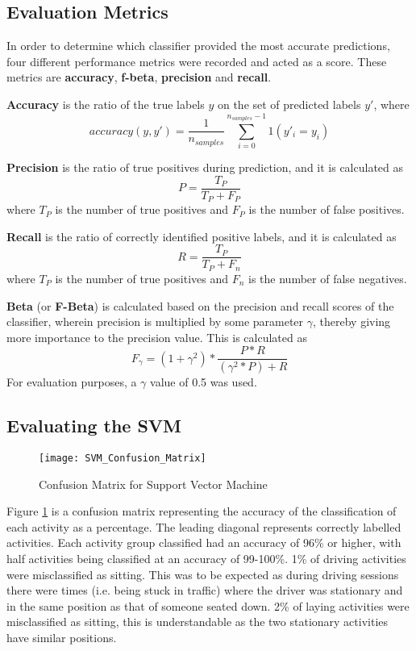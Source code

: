\subsection{Evaluation Metrics}

In order to determine which classifier provided the most accurate predictions, four different performance metrics were recorded and acted as a score. These metrics are \textbf{accuracy},
\textbf{f-beta}, \textbf{precision} and \textbf{recall}.

\textbf{Accuracy} is the ratio of the true labels $y$ on the set of predicted labels $y'$, where \[accuracy(y, y') = \frac{1}{n_{samples}}\sum_{i=0}^{n_{samples}-1} 1(y'_i = y_i)\]

\textbf{Precision} is the ratio of true positives during prediction, and it is calculated as \[P = \frac{T_P}{T_P+F_P}\] where \(T_P\) is the number of true positives and \(F_P\) is the number of false positives.

\textbf{Recall} is the ratio of correctly identified positive labels, and it is calculated as \[R = \frac{T_P}{T_P+F_n}\] where \(T_P\) is the number of true positives and \(F_n\) is the number of false negatives.

\textbf{Beta} (or \textbf{F-Beta})  is calculated based on the precision and recall scores of the classifier, wherein precision is multiplied by some parameter $\gamma$, thereby giving more
importance to the precision value. This is calculated as \[F_\gamma = (1+\gamma^2) * \frac{P*R}{(\gamma^2*P)+R}\] For evaluation purposes, a $\gamma$ value of 0.5 was used.

\subsection{Evaluating the SVM}

\begin{figure}[h]
    \centering
    \texttt{[image: SVM\_Confusion\_Matrix]}
    \caption{Confusion Matrix for Support Vector Machine}
    \label{fig:SVM_Confusion}
    \end{figure}

Figure \ref{fig:SVM_Confusion} is a confusion matrix representing the accuracy of the classification of each activity as a percentage. The leading diagonal represents correctly labelled activities. Each activity group classified had an accuracy of 96\% or higher, with half activities being classified at an accuracy of 99-100\%.
1\% of driving activities were misclassified as sitting. This was to be expected as during driving sessions there were times (i.e. being stuck in traffic) where the driver was stationary and in the same position as that of someone seated down.
2\% of laying activities were misclassified as sitting, this is understandable as the two stationary activities have similar positions.

